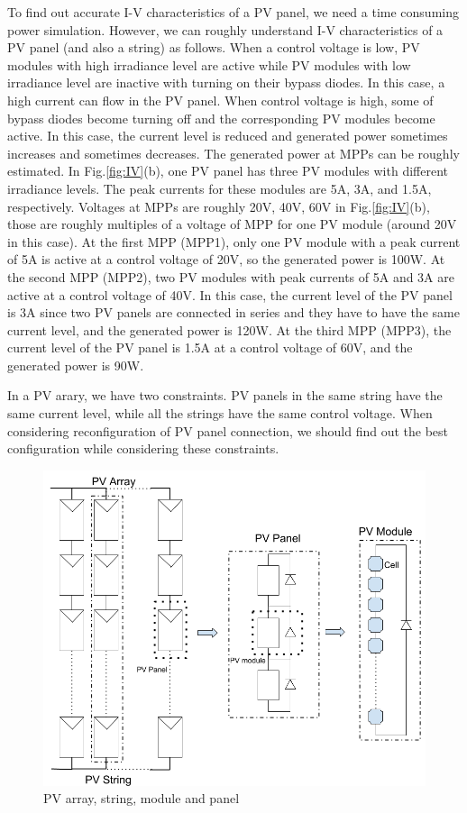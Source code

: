 \documentclass[conference]{IEEEtran}
\begin{document}
To find out accurate I-V characteristics of a PV panel, we need a time consuming power simulation. However, we can roughly understand I-V characteristics of a PV panel (and also a string) as follows. When a control voltage is low, PV modules with high irradiance level are active while PV modules with low irradiance level are inactive with turning on their bypass diodes. In this case, a high current can flow in the PV panel. When control voltage is high, some of bypass diodes become turning off and the corresponding PV modules become active. In this case, the current level is reduced and generated power sometimes increases and sometimes decreases. The generated power at MPPs can be roughly estimated. In Fig.\ref{fig:IV}(b), one PV panel has three PV modules with different irradiance levels. The peak currents for these modules are 5A, 3A, and 1.5A, respectively. Voltages at MPPs are roughly 20V, 40V, 60V in Fig.\ref{fig:IV}(b), those are roughly multiples of a voltage of MPP for one PV module (around 20V in this case). At the first MPP (MPP1), only one PV module with a peak current of 5A is active at a control voltage of 20V, so the generated power is 100W. At the second MPP (MPP2), two PV modules with peak currents of 5A and 3A are active at a control voltage of 40V. In this case, the current level of the PV panel is 3A since two PV panels are connected in series and they have to have the same current level, and the generated power is 120W. At the third MPP (MPP3), the current level of the PV panel is 1.5A at a control voltage of 60V, and the generated power is 90W. 

In a PV arary, we have two constraints. PV panels in the same string have the same current level, while all the strings have the same control voltage. When considering reconfiguration of PV panel connection, we should find out the best configuration while considering these constraints. 

\begin{figure}[t]
    \centering
    \includegraphics[width=0.8\linewidth]{module.png}
    \caption{PV array, string, module and panel}
    \label{model}
\end{figure}
\end{document}
